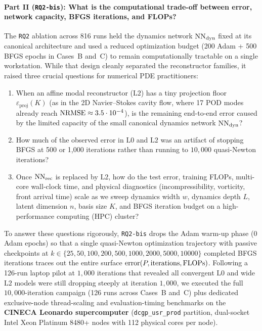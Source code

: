 \paragraph{Part II (\texttt{RQ2-bis}): What is the computational trade-off between error, network capacity, BFGS iterations, and FLOPs?}
The \texttt{RQ2} ablation across 816 runs held the dynamics network $\mathrm{NN}_{\mathrm{dyn}}$ fixed at its canonical architecture and used a reduced optimization budget (200 Adam + 500 BFGS epochs in Cases~B and~C) to remain computationally tractable on a single workstation. While that design cleanly separated the reconstructor families, it raised three crucial questions for numerical PDE practitioners:
\begin{enumerate}[leftmargin=2em]
  \item When an affine modal reconstructor ($\mathrm{L2}$) has a tiny projection floor $\varepsilon_{\mathrm{proj}}(K)$ (as in the 2D Navier--Stokes cavity flow, where 17 POD modes already reach $\mathrm{NRMSE} \approx 3.5\cdot 10^{-4}$), is the remaining end-to-end error caused by the limited capacity of the small canonical dynamics network $\mathrm{NN}_{\mathrm{dyn}}$?
  \item How much of the observed error in $\mathrm{L0}$ and $\mathrm{L2}$ was an artifact of stopping BFGS at 500 or 1,000 iterations rather than running to $10{,}000$ quasi-Newton iterations?
  \item Once $\mathrm{NN}_{\mathrm{rec}}$ is replaced by $\mathrm{L2}$, how do the test error, training FLOPs, multi-core wall-clock time, and physical diagnostics (incompressibility, vorticity, front arrival time) scale as we sweep dynamics width $w$, dynamics depth $L$, latent dimension $n$, basis size $K$, and BFGS iteration budget on a high-performance computing (HPC) cluster?
\end{enumerate}
To answer these questions rigorously, \texttt{RQ2-bis} drops the Adam warm-up phase (0 Adam epochs) so that a single quasi-Newton optimization trajectory with passive checkpoints at $k \in \{25, 50, 100, 200, 500, 1000, 2000, 5000, 10000\}$ completed BFGS iterations traces out the entire surface $\mathrm{error}(P, \text{iterations}, \mathrm{FLOPs})$. Following a 126-run laptop pilot at $1{,}000$ iterations that revealed all convergent $\mathrm{L0}$ and wide $\mathrm{L2}$ models were still dropping steeply at iteration $1{,}000$, we executed the full $10{,}000$-iteration campaign (126 runs across Cases~B and~C) plus dedicated exclusive-node thread-scaling and evaluation-timing benchmarks on the \textbf{CINECA Leonardo supercomputer} (\texttt{dcgp\_usr\_prod} partition, dual-socket Intel Xeon Platinum 8480+ nodes with 112 physical cores per node).

